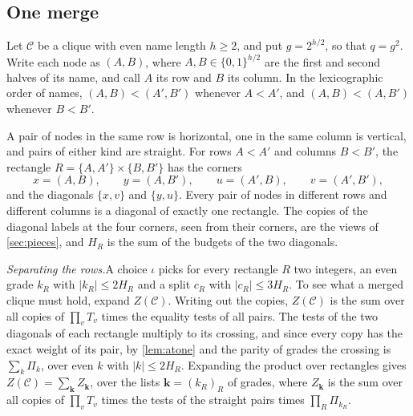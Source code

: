 \documentclass[11pt]{article}
\theoremstyle{definition}
\theoremstyle{definition}
\theoremstyle{remark}
\begin{document}
\subsection{One merge}\label{sec:merge}

Let $\mathcal C$ be a clique with even name length $h\ge2$, and put $g=2^{h/2}$, so that $q=g^2$. Write each node as $(A,B)$, where $A,B\in\{0,1\}^{h/2}$ are the first and second halves of its name, and call $A$ its row and $B$ its column. In the lexicographic order of names, $(A,B)<(A',B')$ whenever $A<A'$, and $(A,B)<(A,B')$ whenever $B<B'$.

A pair of nodes in the same row is horizontal, one in the same column is vertical, and pairs of either kind are straight. For rows $A<A'$ and columns $B<B'$, the rectangle $R=\{A,A'\}\times\{B,B'\}$ has the corners
\[
x=(A,B),\qquad y=(A,B'),\qquad u=(A',B),\qquad v=(A',B'),
\]
and the diagonals $\{x,v\}$ and $\{y,u\}$. Every pair of nodes in different rows and different columns is a diagonal of exactly one rectangle. The copies of the diagonal labels at the four corners, seen from their corners, are the views of \cref{sec:pieces}, and $H_R$ is the sum of the budgets of the two diagonals.

\noindent\emph{Separating the rows.}\quad A choice $\iota$ picks for every rectangle $R$ two integers, an even grade $k_R$ with $|k_R|\le2H_R$ and a split $c_R$ with $|c_R|\le3H_R$. To see what a merged clique must hold, expand $Z(\mathcal C)$. Writing out the copies, $Z(\mathcal C)$ is the sum over all copies of $\prod_vT_v$ times the equality tests of all pairs. The tests of the two diagonals of each rectangle multiply to its crossing, and since every copy has the exact weight of its pair, by \cref{lem:atone} and the parity of grades the crossing is $\sum_k\Pi_k$, over even $k$ with $|k|\le2H_R$. Expanding the product over rectangles gives $Z(\mathcal C)=\sum_{\mathbf k}Z_{\mathbf k}$, over the lists $\mathbf k=(k_R)_R$ of grades, where $Z_{\mathbf k}$ is the sum over all copies of $\prod_vT_v$ times the tests of the straight pairs times $\prod_R\Pi_{k_R}$.
\end{document}
